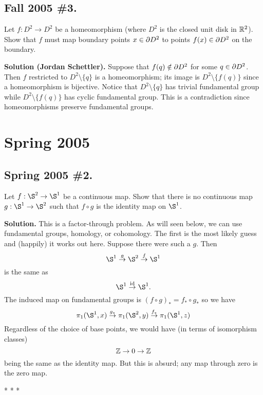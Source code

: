 \documentclass[10pt]{article}
\numberwithin{equation}{subsection}
\begin{document}
\subsection{Fall 2005 \#3.}

Let $f:D^2 \to D^2$ be a homeomorphism (where $D^2$ is the closed unit disk in
$\mathbb{R}^2$).  Show that $f$ must map boundary points $x \in \partial D^2$ to points $f(x)
\in \partial D^2$ on the boundary.

\textbf{Solution (Jordan Schettler).} Suppose that $f(q) \notin \partial D^2$ for
some $q \in \partial D^2$.  Then $f$ restricted to $D^2 \setminus \{q\}$ is a
homeomorphism; its image is $D^2 \setminus \{f(q)\}$ since a homeomorphism is
bijective.  Notice that $D^2 \setminus \{q\}$ has trivial fundamental group
while $D^2 \setminus \{f(q)\}$ has cyclic fundamental group.  This is a
contradiction since homeomorphisms preserve fundamental groups.

\newpage
\section{Spring 2005}

\subsection{Spring 2005 \#2.}
\label{sec:S05.2}

Let $f:\S^2 \to \S^1$ be a continuous map.  Show that there is no continuous map
$g:\S^1 \to \S^2$ such that $f \circ g$ is the identity map on $\S^1$.

\textbf{Solution.}  This is a factor-through problem.  As will seen below, we
can use fundamental groups, homology, or cohomology.  The first is the most
likely guess and (happily) it works out here.  Suppose there were such a $g$.
Then
$$
	\S^1 \stackrel{g}{\to} \S^2 \stackrel{f}{\to} \S^1
$$
is the same as
$$
	\S^1 \stackrel{\id}{\to} \S^1.
$$
The induced map on fundamental groups is $(f \circ g)_* = f_* \circ g_*$ so
we have
$$
	\pi_1(\S^1,x) \stackrel{g_*}{\to}
	\pi_1(\S^2,y) \stackrel{f_*}{\to}
	\pi_1(\S^1,z)
$$
Regardless of the choice of base points, we would have (in terms of isomorphism
classes)
$$
	\mathbb{Z} \to 0 \to \mathbb{Z}
$$
being the same as the identity map.  But this is absurd; any map through zero
is the zero map.

\begin{center}* * *\end{center}
\end{document}
